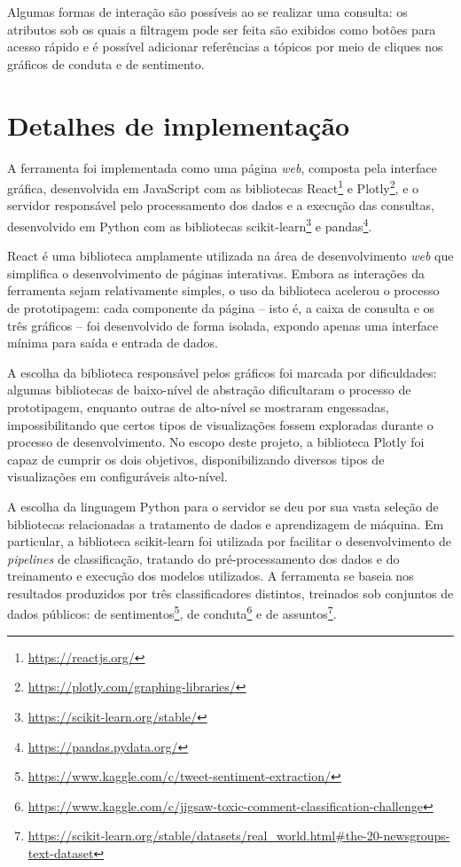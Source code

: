 Algumas formas de interação são possíveis ao se realizar uma consulta: os atributos sob os quais a filtragem pode ser feita são exibidos como botões para acesso rápido e é possível adicionar referências a tópicos por meio de cliques nos gráficos de conduta e de sentimento.

\section{Detalhes de implementação}

A ferramenta foi implementada como uma página \textit{web}, composta pela interface gráfica, desenvolvida em JavaScript com as bibliotecas React\footnote{\url{https://reactjs.org/}} e Plotly\footnote{\url{https://plotly.com/graphing-libraries/}}, e o servidor responsável pelo processamento dos dados e a execução das consultas, desenvolvido em Python com as bibliotecas scikit-learn\footnote{\url{https://scikit-learn.org/stable/}} e pandas\footnote{\url{https://pandas.pydata.org/}}.

React é uma biblioteca amplamente utilizada na área de desenvolvimento \textit{web} que simplifica o desenvolvimento de páginas interativas. Embora as interações da ferramenta sejam relativamente simples, o uso da biblioteca acelerou o processo de prototipagem: cada componente da página -- isto é, a caixa de consulta e os três gráficos -- foi desenvolvido de forma isolada, expondo apenas uma interface mínima para saída e entrada de dados.

A escolha da biblioteca responsável pelos gráficos foi marcada por dificuldades: algumas bibliotecas de baixo-nível de abstração dificultaram o processo de prototipagem, enquanto outras de alto-nível se mostraram engessadas, impossibilitando que certos tipos de visualizações fossem exploradas durante o processo de desenvolvimento. No escopo deste projeto, a biblioteca Plotly foi capaz de cumprir os dois objetivos, disponibilizando diversos tipos de visualizações em configuráveis alto-nível.

A escolha da linguagem Python para o servidor se deu por sua vasta seleção de bibliotecas relacionadas a tratamento de dados e aprendizagem de máquina. Em particular, a biblioteca scikit-learn foi utilizada por facilitar o desenvolvimento de \textit{pipelines} de classificação, tratando do pré-processamento dos dados e do treinamento e execução dos modelos utilizados. A ferramenta se baseia nos resultados produzidos por três classificadores distintos, treinados sob conjuntos de dados públicos: de sentimentos\footnote{\url{https://www.kaggle.com/c/tweet-sentiment-extraction/}}, de conduta\footnote{\url{https://www.kaggle.com/c/jigsaw-toxic-comment-classification-challenge}} e de assuntos\footnote{\url{https://scikit-learn.org/stable/datasets/real_world.html\#the-20-newsgroups-text-dataset}}.

